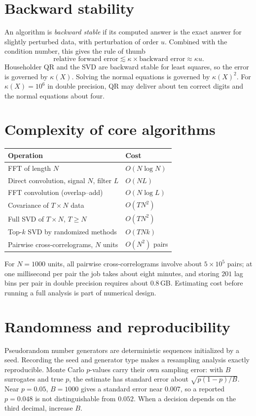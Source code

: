 \section{Backward stability}
An algorithm is \emph{backward stable} if its computed answer is the exact answer for slightly perturbed data, with perturbation of order $u$. Combined with the condition number, this gives the rule of thumb
\[
\text{relative forward error}\lesssim\kappa\times\text{backward error}\approx\kappa u.
\]
Householder QR and the SVD are backward stable for least squares, so the error is governed by $\kappa(X)$. Solving the normal equations is governed by $\kappa(X)^2$. For $\kappa(X)=10^6$ in double precision, QR may deliver about ten correct digits and the normal equations about four.

\section{Complexity of core algorithms}
\begin{center}
\begin{tabular}{@{}ll@{}}
\toprule
Operation & Cost\\
\midrule
FFT of length $N$ & $O(N\log N)$\\
Direct convolution, signal $N$, filter $L$ & $O(NL)$\\
FFT convolution (overlap--add) & $O(N\log L)$\\
Covariance of $T\times N$ data & $O(TN^2)$\\
Full SVD of $T\times N$, $T\ge N$ & $O(TN^2)$\\
Top-$k$ SVD by randomized methods & $O(TNk)$\\
Pairwise cross-correlograms, $N$ units & $O(N^2)$ pairs\\
\bottomrule
\end{tabular}
\end{center}
For $N=1000$ units, all pairwise cross-correlograms involve about $5\times10^5$ pairs; at one millisecond per pair the job takes about eight minutes, and storing $201$ lag bins per pair in double precision requires about $0.8$\,GB. Estimating cost before running a full analysis is part of numerical design.

\section{Randomness and reproducibility}
Pseudorandom number generators are deterministic sequences initialized by a seed. Recording the seed and generator type makes a resampling analysis exactly reproducible. Monte Carlo $p$-values carry their own sampling error: with $B$ surrogates and true $p$, the estimate has standard error about $\sqrt{p(1-p)/B}$. Near $p=0.05$, $B=1000$ gives a standard error near $0.007$, so a reported $p=0.048$ is not distinguishable from $0.052$. When a decision depends on the third decimal, increase $B$.

